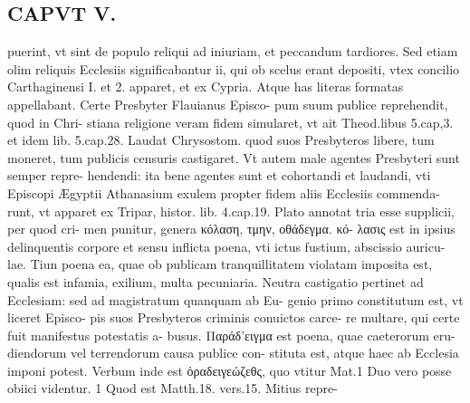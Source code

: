 \documentclass{article}
\begin{document}
\begin{pages}
\section*{CAPVT  V. }
\marginpar{[ p.317 ]}\pstart puerint, vt sint de populo reliqui ad iniuriam, et peccandum tardiores. Sed etiam olim reliquis Ecclesiis significabantur ii, qui ob scelus erant depositi, vtex concilio Carthaginensi I. et 2. apparet, et ex Cypria. Atque has literas formatas appellabant. Certe Presbyter Flauianus Episco- pum suum publice reprehendit, quod in Chri- stiana religione veram fidem simularet, vt ait Theod.libus 5.cap,3. et idem lib.  5.cap.28. Laudat Chrysostom. quod suos Presbyteros libere, tum moneret, tum publicis censuris castigaret. Vt autem male agentes Presbyteri sunt semper repre- hendendi: ita bene agentes sunt et cohortandi et laudandi, vti Episcopi Ægyptii Athanasium exulem propter fidem aliis Ecclesiis commenda- runt, vt apparet ex Tripar, histor. lib.  4.cap.19. Plato annotat tria esse supplicii, per quod cri- men punitur, genera κόλαση, τμην, οθάδεγμα. κό- λασις est in ipsius delinquentis corpore et sensu inflicta poena, vti ictus fustium, abscissio auricu- lae. Tiun poena ea, quae ob publicam tranquillitatem violatam imposita est, qualis est infamia, exilium, multa pecuniaria. Neutra castigatio pertinet ad Ecclesiam: sed ad magistratum quanquam ab Eu- genio primo constitutum est, vt liceret Episco- pis suos Presbyteros criminis conuictos carce- re multare, qui certe fuit manifestus potestatis a- busus. Παράδ'ειγμα est poena, quae caeterorum eru- diendorum vel terrendorum causa publice con- stituta est, atque haec ab Ecclesia imponi potest. Verbum inde est ὀραδειγεώζεθς, quo vtitur Mat.1 Duo vero posse obiici videntur. 1 Quod est Matth.18. vers.15. Mitius repre-  \pend

\end{pages}
\end{document}
